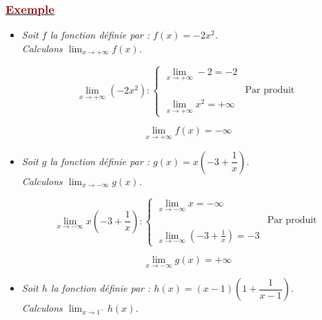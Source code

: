 \documentclass[12pt,a4paper]{article}
\begin{document}
\subsubsection*{\underline{\textcolor{darkred}{ Exemple }}} 

\begin{itemize}
    \item \textit{Soit $f$ la fonction définie par : $f(x) = -2x^2$.} \\
    \textit{Calculons $\displaystyle \lim_{x \to +\infty} f(x)$.}
    
    \vspace{0.2cm}
    
    \[
    \lim_{x \to +\infty} (-2x^2) :
    \begin{cases}
    \displaystyle \lim_{x \to +\infty} -2 = -2 \\
    & \text{Par produit} \\
    \displaystyle \lim_{x \to +\infty} x^2 = +\infty
    \end{cases}
    \]
    
    \[
    \boxed{\lim_{x \to +\infty} f(x) = -\infty}
    \]

    \vspace{0.4cm}

    \item \textit{Soit $g$ la fonction définie par : $g(x) = x \left(-3 + \dfrac{1}{x}\right)$.} \\
    \textit{Calculons $\displaystyle \lim_{x \to -\infty} g(x)$.}
    
    \vspace{0.2cm}
    
    \[
    \lim_{x \to -\infty} x \left(-3 + \frac{1}{x}\right) :
    \begin{cases}
    \displaystyle \lim_{x \to -\infty} x = -\infty \\
    & \text{Par produit} \\
    \displaystyle \lim_{x \to -\infty} \left(-3 + \frac{1}{x}\right) = -3
    \end{cases}
    \]
    
    \[
    \boxed{\lim_{x \to -\infty} g(x) = +\infty}
    \]

    \vspace{0.4cm}

    \item \textit{Soit $h$ la fonction définie par : $h(x) = (x - 1) \left(1 + \dfrac{1}{x - 1}\right)$.} \\
    \textit{Calculons $\displaystyle \lim_{x \to 1^-} h(x)$.}
    

\end{itemize}
\end{document}
